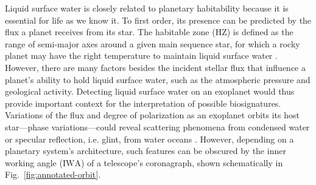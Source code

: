 \documentclass[usenatbib]{mnras}
\newcommand{\IWA}{\ensuremath{\mathrm{IWA}}\xspace}
\begin{document}
Liquid surface water is closely related to planetary habitability because it is essential for life as we know it.
%
To first order, its presence can be predicted by the flux a planet receives from its star.
%
The habitable zone (HZ) is defined as the range of semi-major axes around a given main sequence star, for which a rocky planet may have the right temperature to maintain liquid surface water \citep{kasting93}. 
%
However, there are many factors besides the incident stellar flux that influence a planet's ability to hold liquid surface water, such as the atmospheric pressure and geological activity. 
%
Detecting liquid surface water on an exoplanet would thus provide important context for the interpretation of possible biosignatures.
%
Variations of the flux and degree of polarization as an exoplanet orbits its host star---phase variations---could reveal scattering phenomena from condensed water \citep[e.g., rainbows;][]{bailey2007} or specular reflection, i.e. glint, from water oceans \citep[][]{2008Icar..195..927W}.
%
However, depending on a planetary system's architecture, such features can be obscured by the inner working angle (\IWA) of a telescope's coronagraph, shown schematically in Fig.~\ref{fig:annotated-orbit}.
%





%

%
\end{document}
